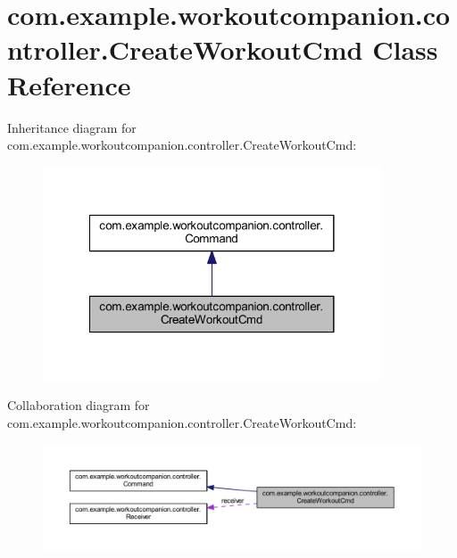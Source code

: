 \hypertarget{classcom_1_1example_1_1workoutcompanion_1_1controller_1_1_create_workout_cmd}{\section{com.\-example.\-workoutcompanion.\-controller.\-Create\-Workout\-Cmd Class Reference}
\label{classcom_1_1example_1_1workoutcompanion_1_1controller_1_1_create_workout_cmd}
}


Inheritance diagram for com.\-example.\-workoutcompanion.\-controller.\-Create\-Workout\-Cmd\-:\nopagebreak
\begin{figure}[H]
\begin{center}
\leavevmode
\includegraphics[width=284pt]{classcom_1_1example_1_1workoutcompanion_1_1controller_1_1_create_workout_cmd__inherit__graph}
\end{center}
\end{figure}


Collaboration diagram for com.\-example.\-workoutcompanion.\-controller.\-Create\-Workout\-Cmd\-:\nopagebreak
\begin{figure}[H]
\begin{center}
\leavevmode
\includegraphics[width=350pt]{classcom_1_1example_1_1workoutcompanion_1_1controller_1_1_create_workout_cmd__coll__graph}
\end{center}
\end{figure}
